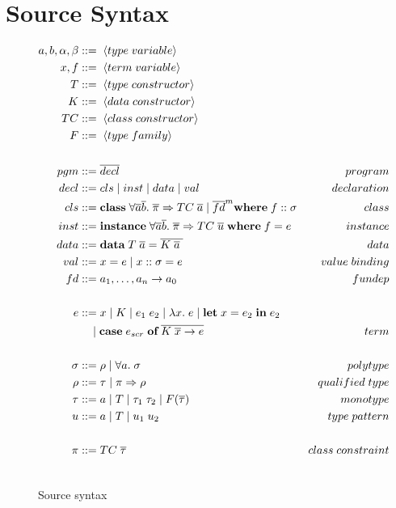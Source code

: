 \section{Source Syntax}
\begin{figure}
\begin{align*}
    a, b, \alpha, \beta &::= \; \langle type \; variable \rangle \\
    x, f                &::= \; \langle term \; variable \rangle \\
    T                   &::= \; \langle type \; constructor \rangle \\
    K                   &::= \; \langle data \; constructor \rangle \\
    TC                  &::= \; \langle class \; constructor \rangle \\
    F                   &::= \; \langle type \; family \rangle \\
    \\
    pgm &::= \overline{decl} &program\\
    decl &::= cls \mid inst \mid data \mid val &declaration\\
    cls &::= \textbf{class} \; \forall \overline{a} \overline{b}. \;
    \overline{\pi} \Rightarrow TC \; \overline{a} \mid \overline{fd}^m
    \textbf{where} \; f :: \sigma &class\\
    inst &::= \textbf{instance} \; \forall \overline{a} \overline{b}. \;
    \overline{\pi} \Rightarrow TC \; \overline{u} \; \textbf{where} \; f = e
    &instance\\
    data &::= \textbf{data} \; T \; \overline{a} = \overline{K \; \overline{a}
    \;} &data\\
    val &::= x = e \mid x :: \sigma = e &value \; binding\\
    fd &::= a_1, \mathellipsis, a_n \rightarrow a_0 &fundep\\
    \\
    e &::= x \mid K \mid e_1 \; e_2 \mid \lambda x. \; e \mid \textbf{let} \; x
    = e_2 \; \textbf{in} \; e_2 \\
    &\quad \mid \textbf{case} \; e_{scr} \; \textbf{of} \; \overline{K \; \overline{x}
    \rightarrow e} &term \\
    \\
    \sigma &::= \rho \mid \forall a. \; \sigma &polytype \\
    \rho &::= \tau \mid \pi \Rightarrow \rho &qualified \; type \\
    \tau &::= a \mid T \mid \tau_1 \; \tau_2 \mid F(\overline{\tau})
         &monotype \\
    u &::= a \mid T \mid u_1 \; u_2 &type \; pattern \\
    \\
    \pi &::= TC \; \overline{\tau} &class \; constraint \\
    \\
\end{align*}
\caption{Source syntax}
\label{fig:source-syntax}
\end{figure}
